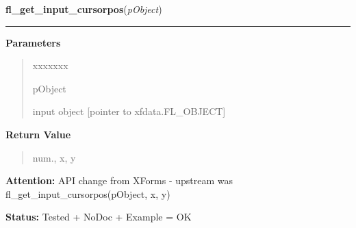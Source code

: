 \hspace{.8\funcindent}\begin{boxedminipage}{\funcwidth}

    \raggedright \textbf{fl\_get\_input\_cursorpos}(\textit{pObject})

    \vspace{-1.5ex}

    \rule{\textwidth}{0.5\fboxrule}
\setlength{\parskip}{2ex}
\setlength{\parskip}{1ex}
      \textbf{Parameters}
      \vspace{-1ex}

      \begin{quote}
        \begin{Ventry}{xxxxxxx}

          \item[pObject]

          input object [pointer to xfdata.FL\_OBJECT]

        \end{Ventry}

      \end{quote}

      \textbf{Return Value}
    \vspace{-1ex}

      \begin{quote}
      num., x, y

      \end{quote}

\textbf{Attention:} API change from XForms - upstream was fl\_get\_input\_cursorpos(pObject, x,
y)



\textbf{Status:} Tested + NoDoc + Example = OK



    \end{boxedminipage}

    \label{xformslib:library:fl_set_input_cursor_visible}

    \vspace{0.5ex}

